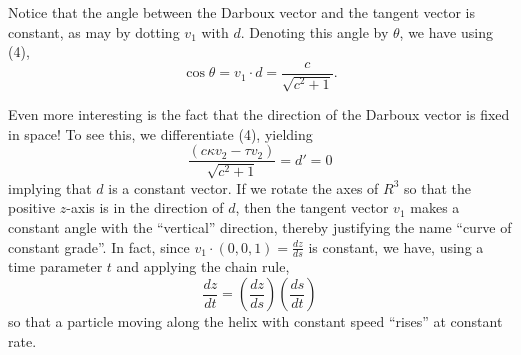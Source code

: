 \documentclass{book}
\begin{document}
Notice that the angle between the Darboux vector and the tangent vector is constant, as may by dotting $v_{1}$ with $d$. Denoting this angle by $\theta$, we have using (4),
\begin{equation}
\cos \theta = v_{1} \cdot d = \frac{c}{ \sqrt{c^{2} + 1} }.
\end{equation}

Even more interesting is the fact that the direction of the Darboux vector is fixed in space! To see this, we differentiate (4), yielding
\begin{equation}
\frac{(c \kappa v_{2} - \tau v_{2}) }{ \sqrt{c^{2} + 1} } = d' = 0
\end{equation}
implying that $d$ is a constant vector. If we rotate the axes of $R^{3}$ so that the positive $z$-axis is in the direction of $d$, then the tangent vector $v_{1}$ makes a constant angle with the ``vertical'' direction, thereby justifying the name ``curve of constant grade''. In fact, since $v_{1} \cdot (0,0,1) = \frac{dz}{ds}$ is constant, we have, using a time parameter $t$ and applying the chain rule,
\begin{equation}
\frac{dz}{dt} = \left( \frac{dz}{ds} \right) \left( \frac{ds}{dt} \right)
\end{equation}
so that a particle moving along the helix with constant speed ``rises'' at constant rate.
\end{document}
